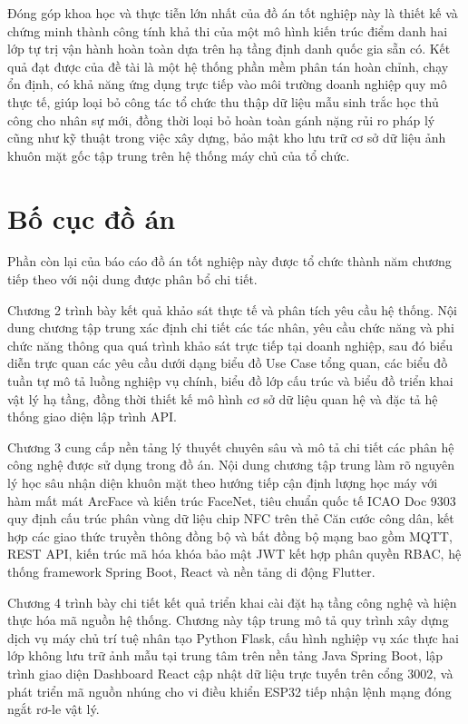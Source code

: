 \documentclass[../DoAn.tex]{subfiles}
\begin{document}
Đóng góp khoa học và thực tiễn lớn nhất của đồ án tốt nghiệp này là thiết kế và chứng minh thành công tính khả thi của một mô hình kiến trúc điểm danh hai lớp tự trị vận hành hoàn toàn dựa trên hạ tầng định danh quốc gia sẵn có. Kết quả đạt được của đề tài là một hệ thống phần mềm phân tán hoàn chỉnh, chạy ổn định, có khả năng ứng dụng trực tiếp vào môi trường doanh nghiệp quy mô thực tế, giúp loại bỏ công tác tổ chức thu thập dữ liệu mẫu sinh trắc học thủ công cho nhân sự mới, đồng thời loại bỏ hoàn toàn gánh nặng rủi ro pháp lý cũng như kỹ thuật trong việc xây dựng, bảo mật kho lưu trữ cơ sở dữ liệu ảnh khuôn mặt gốc tập trung trên hệ thống máy chủ của tổ chức.

\section{Bố cục đồ án}
\label{section:1.4}

Phần còn lại của báo cáo đồ án tốt nghiệp này được tổ chức thành năm chương tiếp theo với nội dung được phân bổ chi tiết.

Chương 2 trình bày kết quả khảo sát thực tế và phân tích yêu cầu hệ thống. Nội dung chương tập trung xác định chi tiết các tác nhân, yêu cầu chức năng và phi chức năng thông qua quá trình khảo sát trực tiếp tại doanh nghiệp, sau đó biểu diễn trực quan các yêu cầu dưới dạng biểu đồ Use Case tổng quan, các biểu đồ tuần tự mô tả luồng nghiệp vụ chính, biểu đồ lớp cấu trúc và biểu đồ triển khai vật lý hạ tầng, đồng thời thiết kế mô hình cơ sở dữ liệu quan hệ và đặc tả hệ thống giao diện lập trình API.

Chương 3 cung cấp nền tảng lý thuyết chuyên sâu và mô tả chi tiết các phân hệ công nghệ được sử dụng trong đồ án. Nội dung chương tập trung làm rõ nguyên lý học sâu nhận diện khuôn mặt theo hướng tiếp cận định lượng học máy với hàm mất mát ArcFace và kiến trúc FaceNet, tiêu chuẩn quốc tế ICAO Doc 9303 quy định cấu trúc phân vùng dữ liệu chip NFC trên thẻ Căn cước công dân, kết hợp các giao thức truyền thông đồng bộ và bất đồng bộ mạng bao gồm MQTT, REST API, kiến trúc mã hóa khóa bảo mật JWT kết hợp phân quyền RBAC, hệ thống framework Spring Boot, React và nền tảng di động Flutter.

Chương 4 trình bày chi tiết kết quả triển khai cài đặt hạ tầng công nghệ và hiện thực hóa mã nguồn hệ thống. Chương này tập trung mô tả quy trình xây dựng dịch vụ máy chủ trí tuệ nhân tạo Python Flask, cấu hình nghiệp vụ xác thực hai lớp không lưu trữ ảnh mẫu tại trung tâm trên nền tảng Java Spring Boot, lập trình giao diện Dashboard React cập nhật dữ liệu trực tuyến trên cổng 3002, và phát triển mã nguồn nhúng cho vi điều khiển ESP32 tiếp nhận lệnh mạng đóng ngắt rơ-le vật lý.
\end{document}
